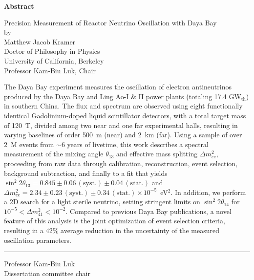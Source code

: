 \DoubleSpacing

\begin{center}
  \mylarge
  \textbf{Abstract}

  \vspace{1.5\baselineskip}
  Precision Measurement of Reactor Neutrino Oscillation with Daya Bay\\
  \vspace{\baselineskip} by\\
  \vspace{\baselineskip} Matthew Jacob Kramer\\
  Doctor of Philosophy in Physics\\
  University of California, Berkeley\\
  Professor Kam-Biu Luk, Chair
  \vspace{\baselineskip}
\end{center}

\normalsize
\MyDoubleSpacing
\noindent
%
The Daya Bay experiment measures the oscillation of electron antineutrinos
produced by the Daya Bay and Ling Ao-I \& II power plants (totaling 17.4
GW$_\mathrm{th}$) in southern China. The flux and spectrum are observed using
eight functionally identical Gadolinium-doped liquid scintillator detectors,
with a total target mass of 120~T, divided among two near and one far
experimental halls, resulting in varying baselines of order 500~m (near) and
2~km (far). Using a sample of over 2~M events from $\sim$6 years of livetime,
this work describes a spectral measurement of the mixing angle $\theta_{13}$ and
effective mass splitting $\Delta m^2_{ee}$, proceeding from raw data through
calibration, reconstruction, event selection, background subtraction, and
finally to a fit that yields $\sin^2 2\theta_{13} = 0.845 \pm
0.06\,\mathrm{(syst.)} \pm 0.04\,\mathrm{(stat.)}$ and $\Delta m^2_{ee} = 2.34
\pm 0.23\,\mathrm{(syst.)} \pm 0.34\,\mathrm{(stat.)} \times 10^{-5}$~eV$^2$. In
addition, we perform a 2D search for a light sterile neutrino, setting stringent
limits on $\sin^2 2\theta_{14}$ for $10^{-5} < \Delta m^2_{41} < 10^{-2}$.
Compared to previous Daya Bay publications, a novel feature of this analysis is
the joint optimization of event selection criteria, resulting in a 42$\%$
average reduction in the uncertainty of the measured oscillation parameters.

\SingleSpacing
\vspace{2.5\baselineskip}
\hfill
\begin{minipage}{0.4\textwidth}
  \hrule\vspace{0.4\baselineskip}
  Professor Kam-Biu Luk\\
  Dissertation committee chair
\end{minipage}

\clearpage